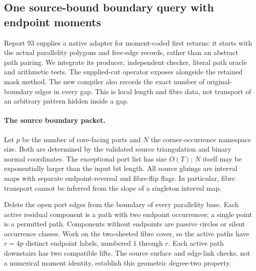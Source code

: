\subsection{One source-bound boundary query with endpoint moments}
\label{marked-cut:moments}

Report 93 supplies a native adapter for moment-coded first returns: it starts
with the actual parallelity polygons and free-edge records, rather than an
abstract path pairing. We integrate its producer, independent checker,
literal path oracle and arithmetic tests. The supplied-cut operator exposes
 alongside the retained mask method. The
new compiler also records the exact number of original-boundary edges in
every gap. This is local length and fibre data, not transport of an arbitrary
pattern hidden inside a gap.

\paragraph{The source boundary packet.}
Let $p$ be the number of core-facing ports and $N$ the corner-occurrence
namespace size. Both are determined by the validated source triangulation
and binary normal coordinates. The exceptional port list has size $O(T)$;
$N$ itself may be exponentially larger than the input bit length. All source
gluings are interval maps with separate endpoint-reversal and fibre-flip
flags. In particular, fibre transport cannot be inferred from the slope of
a singleton interval map.

Delete the open port edges from the boundary of every parallelity base.
Each active residual component is a path with two endpoint occurrences;
a single point is a permitted path. Components without endpoints are passive
circles or silent occurrence classes. Work on the two-sheeted fibre cover,
so the active paths have $r=4p$ distinct endpoint labels, numbered $1$ through
$r$. Each active path downstairs has two compatible lifts. The source
surface and edge-link checks, not a numerical moment identity, establish
this geometric degree-two property.

